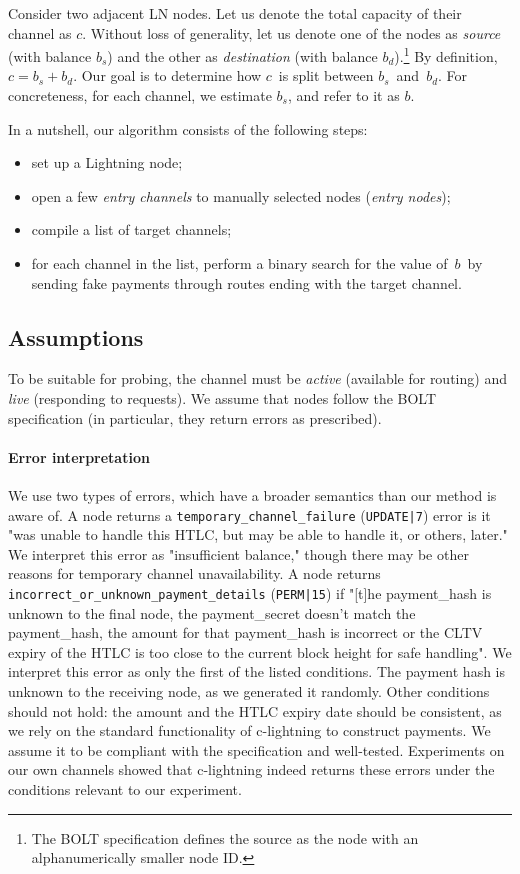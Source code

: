 Consider two adjacent LN nodes.
Let us denote the total capacity of their channel as $c$.
Without loss of generality, let us denote one of the nodes as \textit{source} (with balance $b_s$) and the other as \textit{destination} (with balance $b_d$).\footnote{The BOLT specification defines the source as the node with an alphanumerically smaller node ID.}
By definition, $c = b_s + b_d$.
Our goal is to determine how $c$~is split between $b_s$~and~$b_d$.
For concreteness, for each channel, we estimate $b_s$, and refer to it as $b$.

In a nutshell, our algorithm consists of the following steps:
\begin{itemize}
	\item set up a Lightning node;
	\item open a few \textit{entry channels} to manually selected nodes (\textit{entry nodes});
	\item compile a list of target channels;
	\item for each channel in the list, perform a binary search for the value of~$b$~by sending fake payments through routes ending with the target channel.
\end{itemize}

\subsection{Assumptions}

To be suitable for probing, the channel must be \textit{active} (available for routing) and \textit{live} (responding to requests).
We assume that nodes follow the BOLT specification (in particular, they return errors as prescribed).

\paragraph{Error interpretation}
We use two types of errors, which have a broader semantics than our method is aware of.
A node returns a \texttt{temporary\_channel\_failure} (\texttt{UPDATE|7}) error is it "was unable to handle this HTLC, but may be able to handle it, or others, later."
We interpret this error as "insufficient balance," though there may be other reasons for temporary channel unavailability.
A node returns \texttt{incorrect\_or\_unknown\_payment\_details} (\texttt{PERM|15}) if "[t]he payment\_hash is unknown to the final node, the payment\_secret doesn't match the payment\_hash, the amount for that payment\_hash is incorrect or the CLTV expiry of the HTLC is too close to the current block height for safe handling".
We interpret this error as only the first of the listed conditions.
The payment hash is unknown to the receiving node, as we generated it randomly.
Other conditions should not hold: the amount and the HTLC expiry date should be consistent, as we rely on the standard functionality of c-lightning to construct payments.
We assume it to be compliant with the specification and well-tested.
Experiments on our own channels showed that c-lightning indeed returns these errors under the conditions relevant to our experiment.

